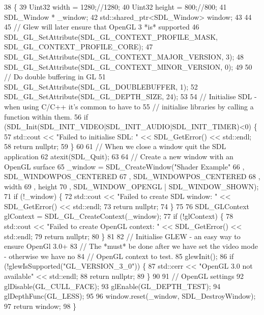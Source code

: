 \begin{DoxyCode}
38                                               \{
39   Uint32 width = 1280;\textcolor{comment}{//1280;}
40   Uint32 height = 800;\textcolor{comment}{//800;}
41   SDL\_Window * \_window;
42   std::shared\_ptr<SDL\_Window> window;
43   
44 
45   \textcolor{comment}{// Glew will later ensure that OpenGL 3 *is* supported}
46   SDL\_GL\_SetAttribute(SDL\_GL\_CONTEXT\_PROFILE\_MASK, SDL\_GL\_CONTEXT\_PROFILE\_CORE);
47   SDL\_GL\_SetAttribute(SDL\_GL\_CONTEXT\_MAJOR\_VERSION, 3);
48   SDL\_GL\_SetAttribute(SDL\_GL\_CONTEXT\_MINOR\_VERSION, 0);
49 
50   \textcolor{comment}{// Do double buffering in GL}
51   SDL\_GL\_SetAttribute(SDL\_GL\_DOUBLEBUFFER, 1);
52   SDL\_GL\_SetAttribute(SDL\_GL\_DEPTH\_SIZE, 24);
53  
54   \textcolor{comment}{// Initialise SDL - when using C/C++ it's common to have to}
55   \textcolor{comment}{// initialise libraries by calling a function within them.}
56   \textcolor{keywordflow}{if} (SDL\_Init(SDL\_INIT\_VIDEO|SDL\_INIT\_AUDIO|SDL\_INIT\_TIMER)<0) \{
57     std::cout << \textcolor{stringliteral}{"Failed to initialise SDL: "} << SDL\_GetError() << std::endl;
58     \textcolor{keywordflow}{return} \textcolor{keyword}{nullptr};
59   \}
60 
61   \textcolor{comment}{// When we close a window quit the SDL application}
62   atexit(SDL\_Quit);
63 
64   \textcolor{comment}{// Create a new window with an OpenGL surface}
65   \_window = SDL\_CreateWindow(\textcolor{stringliteral}{"Shader Example"}
66                              , SDL\_WINDOWPOS\_CENTERED
67                              , SDL\_WINDOWPOS\_CENTERED
68                              , width
69                              , height
70                              , SDL\_WINDOW\_OPENGL | SDL\_WINDOW\_SHOWN);
71   \textcolor{keywordflow}{if} (!\_window) \{
72     std::cout << \textcolor{stringliteral}{"Failed to create SDL window: "} << SDL\_GetError() << std::endl;
73     \textcolor{keywordflow}{return} \textcolor{keyword}{nullptr};
74   \}
75 
76   SDL\_GLContext glContext = SDL\_GL\_CreateContext(\_window);
77   \textcolor{keywordflow}{if} (!glContext) \{
78     std::cout << \textcolor{stringliteral}{"Failed to create OpenGL context: "} << SDL\_GetError() << std::endl;
79     \textcolor{keywordflow}{return} \textcolor{keyword}{nullptr};
80   \}
81 
82   \textcolor{comment}{// Initialise GLEW - an easy way to ensure OpenGl 3.0+}
83   \textcolor{comment}{// The *must* be done after we have set the video mode - otherwise we have no}
84   \textcolor{comment}{// OpenGL context to test.}
85   glewInit();
86   \textcolor{keywordflow}{if} (!glewIsSupported(\textcolor{stringliteral}{"GL\_VERSION\_3\_0"})) \{
87     std::cerr << \textcolor{stringliteral}{"OpenGL 3.0 not available"} << std::endl;
88     \textcolor{keywordflow}{return} \textcolor{keyword}{nullptr};
89   \}
90 
91   \textcolor{comment}{// OpenGL settings}
92   glDisable(GL\_CULL\_FACE);
93   glEnable(GL\_DEPTH\_TEST);
94   glDepthFunc(GL\_LESS);
95 
96   window.reset(\_window, SDL\_DestroyWindow);
97   \textcolor{keywordflow}{return} window;
98 \}
\end{DoxyCode}



